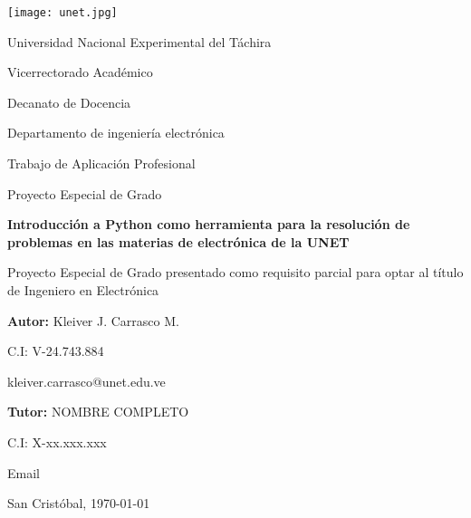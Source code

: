 \begin{titlepage}
\begin{center}
	\texttt{[image: unet.jpg]}
	
	Universidad Nacional Experimental del Táchira 
	
	Vicerrectorado Académico
	
	Decanato de Docencia
	
	Departamento de ingeniería electrónica
	
	Trabajo de Aplicación Profesional
	
	Proyecto Especial de Grado
\end{center}

\centering
	\vspace{2.5cm}
	\vfill
	{\Large \textbf{Introducción a Python como herramienta para la resolución de problemas en las materias de electrónica de la UNET}\par}
	\vspace{10pt}
	{\large Proyecto Especial de Grado presentado como requisito parcial para optar al título de Ingeniero en Electrónica}

\vfill
\begin{flushright}
	\begin{spacing}{1.5}
		\textbf{Autor:} Kleiver J. Carrasco M.
		
		C.I: V-24.743.884
		
		kleiver.carrasco@unet.edu.ve
		
		\textbf{Tutor:} NOMBRE COMPLETO
		
		C.I: X-xx.xxx.xxx
		
		Email
	\end{spacing}	
\end{flushright}

\vfill
	San Cristóbal, \monthyeardate\today
\leavevmode
\end{titlepage}